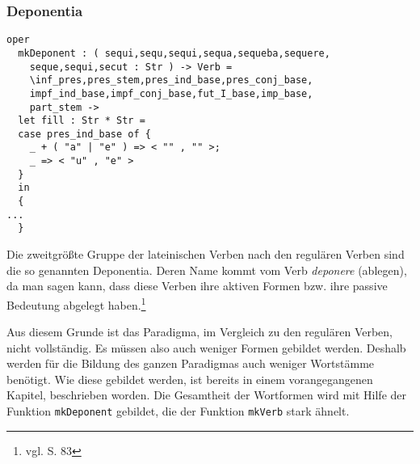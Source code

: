 \subsubsection{Deponentia}
\begin{lstlisting}[float=h!tp,caption={Kopf der Funktion um Deponentia-Formen zu bilden (vgl. \textbf{ResLat.gf})},label={GF-Res-MkDeponent},basicstyle=\small]
oper
  mkDeponent : ( sequi,sequ,sequi,sequa,sequeba,sequere,
    seque,sequi,secut : Str ) -> Verb =
    \inf_pres,pres_stem,pres_ind_base,pres_conj_base,
    impf_ind_base,impf_conj_base,fut_I_base,imp_base,
    part_stem -> 
  let fill : Str * Str =
  case pres_ind_base of {
    _ + ( "a" | "e" ) => < "" , "" >;
    _ => < "u" , "e" > 
  }
  in
  {
...
  }
\end{lstlisting}
Die zweitgrößte Gruppe der lateinischen Verben nach den regulären Verben sind die so genannten Deponentia. Deren Name kommt vom Verb \textit{deponere} (ablegen), da man sagen kann, dass diese Verben ihre aktiven Formen bzw. ihre passive Bedeutung abgelegt haben.\footnote{vgl. \cite{BAYER-LINDAUER1994} S. 83} \par
Aus diesem Grunde ist das Paradigma, im Vergleich zu den regulären Verben, nicht vollständig. Es müssen also auch weniger Formen gebildet werden. Deshalb werden für die Bildung des ganzen Paradigmas auch weniger Wortstämme benötigt. Wie diese gebildet werden, ist bereits in einem vorangegangenen Kapitel, beschrieben worden. Die Gesamtheit der Wortformen wird mit Hilfe der Funktion \texttt{mkDeponent} gebildet, die der Funktion \texttt{mkVerb} stark ähnelt.\par
